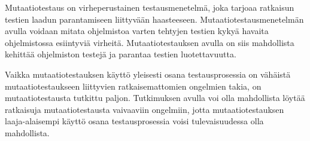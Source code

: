 \documentclass[finnish, grading]{tktltiki2}
\theoremstyle{definition}
\theoremstyle{remark}
\begin{document}
Mutaatiotestaus on virheperustainen testausmenetelmä, joka tarjoaa ratkaisun testien laadun parantamiseen liittyvään haasteeseen. Mutaatiotestausmenetelmän avulla voidaan mitata ohjelmistoa varten tehtyjen testien kykyä havaita ohjelmistossa esiintyviä virheitä. Mutaatiotestauksen avulla on siis mahdollista kehittää ohjelmiston testejä ja parantaa testien luotettavuutta.

Vaikka mutaatiotestauksen käyttö yleisesti osana testausprosessia on vähäistä mutaatiotestaukseen liittyvien ratkaisemattomien ongelmien takia, on mutaatiotestausta tutkittu paljon. Tutkimuksen avulla voi olla mahdollista löytää ratkaisuja mutaatiotestausta vaivaaviin ongelmiin, jotta mutaatiotestauksen laaja-alaisempi käyttö osana testausprosessia voisi tulevaisuudessa olla mahdollista.





\end{document}
